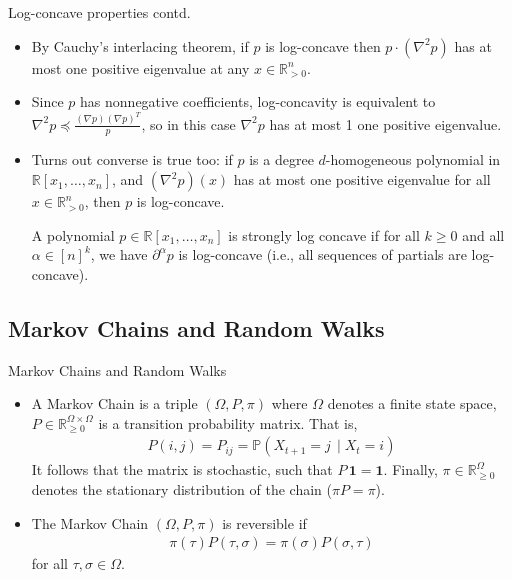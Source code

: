 \documentclass[10pt]{beamer}
\newcommand{\R}{\mathbb{R}}
\begin{document}
\begin{frame}{Log-concave properties contd.}
    \begin{itemize}
        \item By Cauchy's interlacing theorem, if $p$ is log-concave then $p \cdot (\nabla^2 p)$ has at most one positive eigenvalue at any $x \in \R^n_{> 0}$. 
        
        \item Since $p$ has nonnegative coefficients, log-concavity is equivalent to $\nabla^2 p \preceq \frac{(\nabla p)(\nabla p)^T}{p}$, so in this case $\nabla^2 p$ has at most 1 one positive eigenvalue.

        \item Turns out converse is true too: if $p$ is a degree $d$-homogeneous polynomial in $\R[x_1, \ldots, x_n]$, and $(\nabla^2 p)(x)$ has at most one positive eigenvalue for all $x \in \R^n_{>0}$, then $p$ is log-concave.

        \begin{definition} A polynomial $p \in \R[x_1, \ldots, x_n]$ is strongly log concave if for all $k \geq 0$ and all $\alpha \in [n]^k$, we have $\partial^{\alpha} p$ is log-concave (i.e., all sequences of partials are log-concave). \end{definition}
    \end{itemize}
\end{frame}


\subsection{Markov Chains and Random Walks}
\begin{frame}{Markov Chains and Random Walks}
    \begin{itemize}
        \item A Markov Chain is a triple $(\Omega, P, \pi)$ where $\Omega$ denotes a finite state space, $P \in \R^{\Omega \times \Omega}_{\geq 0}$ is a transition probability matrix. That is, \begin{align*}
            P(i,j) = P_{ij} = \mathbb{P}(X_{t+1} = j \hspace{2pt} \mid X_t = i)
        \end{align*} 
        It follows that the matrix is stochastic, such that $P \hspace{2pt} \mathbf{1} = \mathbf{1}$. 
        Finally, $\pi \in \R_{\geq 0}^\Omega$ denotes the stationary distribution of the chain ($\pi P = \pi$).
        \item The Markov Chain $(\Omega, P, \pi)$ is reversible if \begin{align*}
            \pi(\tau)P(\tau, \sigma) = \pi(\sigma)P(\sigma, \tau)
        \end{align*}
        for all $\tau, \sigma \in \Omega$.
    \end{itemize}
\end{frame}
\end{document}
